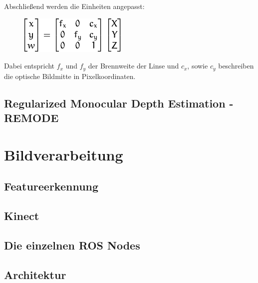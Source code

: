 Abschließend werden die Einheiten angepasst:

\begin{figure}[ht]
	\centering
	\includegraphics[scale=0.7]{Bilder/matrixEquation.png}
	\label{fig:radial}
\end{figure}

Dabei entspricht $f_x$ und $f_y$ der Brennweite der Linse und $c_x$, sowie $c_y$ beschreiben die optische Bildmitte in Pixelkoordinaten. \newline



\subsection{Regularized Monocular Depth Estimation - REMODE}








\section{Bildverarbeitung}
\label{Bildverarbeitung}

\subsection{Featureerkennung}
\subsection{Kinect}
\subsection{Die einzelnen ROS Nodes}
\subsection{Architektur}





